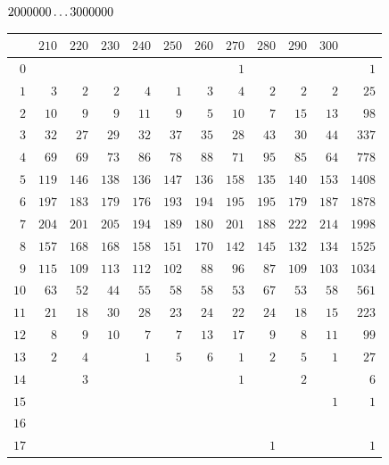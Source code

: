 \par\medskip
\noindent\begin{minipage}{\linewidth}\centering
{}
\(2000000\mathinner{.\,.\,.}3000000\)\par\smallskip
\begingroup\fontsize{10}{10.5}\selectfont\setlength{\tabcolsep}{3.5pt}\renewcommand{\arraystretch}{1}
\begin{tabular}{r|rrrrrrrrrr|r}\hline
 & $210$ & $220$ & $230$ & $240$ & $250$ & $260$ & $270$ & $280$ & $290$ & $300$ &  \\ \hline
$0$ &  &  &  &  &  &  & $1$ &  &  &  & $1$ \\
$1$ & $3$ & $2$ & $2$ & $4$ & $1$ & $3$ & $4$ & $2$ & $2$ & $2$ & $25$ \\
$2$ & $10$ & $9$ & $9$ & $11$ & $9$ & $5$ & $10$ & $7$ & $15$ & $13$ & $98$ \\
$3$ & $32$ & $27$ & $29$ & $32$ & $37$ & $35$ & $28$ & $43$ & $30$ & $44$ & $337$ \\
$4$ & $69$ & $69$ & $73$ & $86$ & $78$ & $88$ & $71$ & $95$ & $85$ & $64$ & $778$ \\
$5$ & $119$ & $146$ & $138$ & $136$ & $147$ & $136$ & $158$ & $135$ & $140$ & $153$ & $1408$ \\
$6$ & $197$ & $183$ & $179$ & $176$ & $193$ & $194$ & $195$ & $195$ & $179$ & $187$ & $1878$ \\
$7$ & $204$ & $201$ & $205$ & $194$ & $189$ & $180$ & $201$ & $188$ & $222$ & $214$ & $1998$ \\
$8$ & $157$ & $168$ & $168$ & $158$ & $151$ & $170$ & $142$ & $145$ & $132$ & $134$ & $1525$ \\
$9$ & $115$ & $109$ & $113$ & $112$ & $102$ & $88$ & $96$ & $87$ & $109$ & $103$ & $1034$ \\
$10$ & $63$ & $52$ & $44$ & $55$ & $58$ & $58$ & $53$ & $67$ & $53$ & $58$ & $561$ \\
$11$ & $21$ & $18$ & $30$ & $28$ & $23$ & $24$ & $22$ & $24$ & $18$ & $15$ & $223$ \\
$12$ & $8$ & $9$ & $10$ & $7$ & $7$ & $13$ & $17$ & $9$ & $8$ & $11$ & $99$ \\
$13$ & $2$ & $4$ &  & $1$ & $5$ & $6$ & $1$ & $2$ & $5$ & $1$ & $27$ \\
$14$ &  & $3$ &  &  &  &  & $1$ &  & $2$ &  & $6$ \\
$15$ &  &  &  &  &  &  &  &  &  & $1$ & $1$ \\
$16$ &  &  &  &  &  &  &  &  &  &  &  \\
$17$ &  &  &  &  &  &  &  & $1$ &  &  & $1$ \\

\end{tabular}
\end{minipage}
